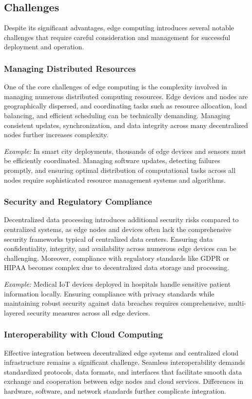 \documentclass[runningheads]{llncs}
\begin{document}
\subsection{Challenges}

Despite its significant advantages, edge computing introduces several notable challenges that require careful consideration and management for successful deployment and operation.

\subsubsection{Managing Distributed Resources}
One of the core challenges of edge computing is the complexity involved in managing numerous distributed computing resources. Edge devices and nodes are geographically dispersed, and coordinating tasks such as resource allocation, load balancing, and efficient scheduling can be technically demanding. Managing consistent updates, synchronization, and data integrity across many decentralized nodes further increases complexity.

\noindent\textit{Example:} In smart city deployments, thousands of edge devices and sensors must be efficiently coordinated. Managing software updates, detecting failures promptly, and ensuring optimal distribution of computational tasks across all nodes require sophisticated resource management systems and algorithms.

\subsubsection{Security and Regulatory Compliance}
Decentralized data processing introduces additional security risks compared to centralized systems, as edge nodes and devices often lack the comprehensive security frameworks typical of centralized data centers. Ensuring data confidentiality, integrity, and availability across numerous edge devices can be challenging. Moreover, compliance with regulatory standards like GDPR or HIPAA becomes complex due to decentralized data storage and processing.

\noindent\textit{Example:} Medical IoT devices deployed in hospitals handle sensitive patient information locally. Ensuring compliance with privacy standards while maintaining robust security against data breaches requires comprehensive, multi-layered security measures across all edge devices.

\subsubsection{Interoperability with Cloud Computing}
Effective integration between decentralized edge systems and centralized cloud infrastructure remains a significant challenge. Seamless interoperability demands standardized protocols, data formats, and interfaces that facilitate smooth data exchange and cooperation between edge nodes and cloud services. Differences in hardware, software, and network standards further complicate integration.
\end{document}

